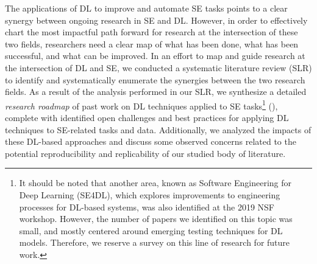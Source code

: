 The applications of DL to improve and automate SE tasks points to a clear synergy between ongoing research in SE and DL. However, in order to effectively chart the most impactful path forward for research at the intersection of these two fields, researchers need a clear map of what has been done, what has been successful, and what can be improved. %
In an effort to map and guide research at the intersection of DL and SE, we conducted a systematic literature review (SLR) to identify and systematically enumerate the synergies between the two research fields. As a result of the analysis performed in our SLR, we synthesize a detailed \textit{research roadmap} of past work on DL techniques applied to SE tasks\footnote{It should be noted that another area, known as Software Engineering for Deep Learning (SE4DL), which explores improvements to engineering processes for DL-based systems, was also identified at the 2019 NSF workshop. However, the number of papers we identified on this topic was small, and mostly centered around emerging testing techniques for DL models. Therefore, we reserve a survey on this line of research for future work.} (\ie \dlse), complete with identified open challenges and best practices for applying DL techniques to SE-related tasks and data. Additionally, we analyzed the impacts of these DL-based approaches and discuss some observed concerns related to the potential reproducibility and replicability of our studied body of literature. %